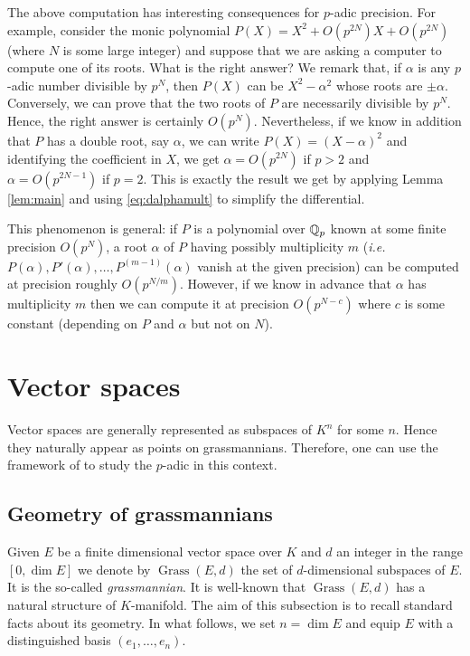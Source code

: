 \documentclass{sig-alternate}
\DeclareMathOperator{\Grass}{Grass}
\begin{document}
{The above computation has interesting consequences for $p$-adic 
precision. For example, consider the monic 
polynomial $P(X) = X^2 + O(p^{2N}) X + O(p^{2N})$ (where $N$ is some 
large integer) and suppose that we are asking a computer to compute one 
of its roots. What is the right answer? We remark that, if $\alpha$ is 
any $p$-adic number divisible by $p^N$, then $P(X)$ can be $X^2 - 
\alpha^2$ whose roots are $\pm \alpha$. Conversely, we can prove that 
the two roots of $P$ are necessarily divisible by $p^N$. Hence, the
right answer is certainly $O(p^N)$. Nevertheless, if we know in addition 
that $P$ has a double root, say $\alpha$, we can write $P(X) = (X - 
\alpha)^2$ and identifying the coefficient in $X$, we get $\alpha =
O(p^{2N})$ if $p > 2$ and $\alpha = O(p^{2N-1})$ if $p=2$.
This is exactly the result we get by applying Lemma \ref{lem:main} and
using \eqref{eq:dalphamult} to simplify the differential.

This phenomenon is general: if $P$ is a polynomial over $\mathbb Q_p$ known at 
some finite precision $O(p^N)$, a root $\alpha$ of $P$ having possibly 
multiplicity $m$ (\emph{i.e.} $P(\alpha), P'(\alpha), \ldots, P^{(m-1)} 
(\alpha)$ vanish at the given precision) can be computed at precision 
roughly $O(p^{N/m})$. However, if we know in advance that $\alpha$ has 
multiplicity $m$ then we can compute it at precision $O(p^{N-c})$ 
where $c$ is some constant (depending on $P$ and $\alpha$ but not on
$N$).

}


\section{Vector spaces}
\label{sec:vectorspaces}

Vector spaces are generally represented as subspaces of $K^n$ for some 
$n$. Hence they naturally appear as points on grassmannians. Therefore, 
one can use the framework of \cite[Appendix A]{caruso-roe-vaccon:14a} to 
study the $p$-adic in this context.

\subsection{Geometry of grassmannians}

Given $E$ be a finite dimensional vector space over $K$ and $d$ an 
integer in the range $[0, \dim E]$ we denote by $\Grass(E,d)$ the 
set of $d$-dimensional subspaces of $E$. It is the so-called 
\emph{grassmannian}. It is well-known that $\Grass(E,d)$ has a 
natural structure of $K$-manifold. The aim of this subsection is to 
recall standard facts about its geometry. In what follows, we set
$n = \dim E$ and equip $E$ with a distinguished basis $(e_1, \ldots, 
e_n)$.
\end{document}
